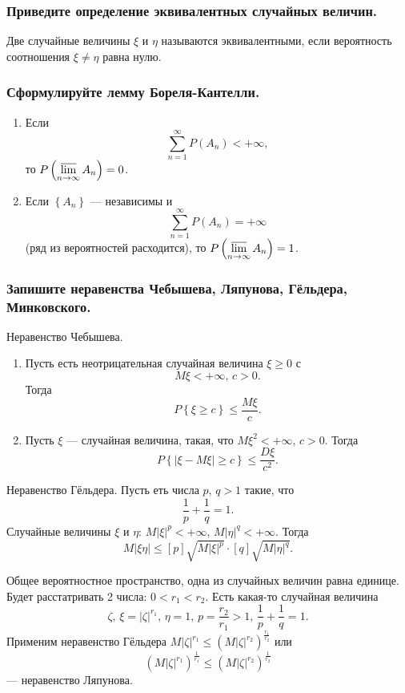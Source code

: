 \subsubsection*{Приведите определение эквивалентных случайных величин.}

Две случайные величины $ \xi $ и $ \eta $ называются эквивалентными, если вероятность соотношения $ \xi \neq \eta $ равна нулю.

\subsubsection*{Сформулируйте лемму Бореля-Кантелли.}

\begin{enumerate}
\item Если
$$ \sum \limits_{n=1}^{ \infty } P \left( A_n \right) < + \infty,$$
то $P \left( \varlimsup \limits_{n \to \infty } A_n \right) = 0$.
\item Если $ \left\{ A_n \right\} $ --- независимы и
$$ \sum \limits_{n=1}^{ \infty } P \left( A_n \right) = + \infty $$
(ряд из вероятностей расходится), то $P \left( \varlimsup \limits_{n \to \infty } A_n \right) = 1$.
\end{enumerate}

\subsubsection*{Запишите неравенства Чебышева, Ляпунова, Гёльдера, Минковского.}

Неравенство Чебышева.
\begin{enumerate}
\item Пусть есть неотрицательная случайная величина $ \xi \geq 0$ с
$$M \xi < + \infty, \,
c > 0.$$
Тогда
$$P \left\{ \xi \geq c \right\} \leq \frac{M \xi }{c}.$$
\item Пусть $ \xi $ --- случайная величина, такая, что $M \xi^2 < + \infty, \, c > 0$.
Тогда
$$P \left\{ \left| \xi - M \xi \right| \geq c \right\} \leq \frac{D \xi }{c^2}.$$
\end{enumerate}

Неравенство Гёльдера.
Пусть еть числа $p, \, q > 1$ такие, что
$$ \frac{1}{p} + \frac{1}{q} = 1.$$
Случайные величины $ \xi $ и $ \eta: \, M \left| \xi \right|^p < + \infty, \, M \left| \eta \right|^q < + \infty $.
Тогда
$$M \left| \xi \eta \right| \leq [p]\sqrt{M \left| \xi \right|^p} \cdot [q]\sqrt{M \left| \eta \right|^q}.$$

Общее вероятностное пространство, одна из случайных величин равна единице.
Будет расстатривать 2 числа: $0 < r_1 < r_2$.
Есть какая-то случайная величина
$$ \zeta, \,
\xi = \left| \zeta \right|^{r_1}, \,
\eta = 1, \,
p = \frac{r_2}{r_1} > 1, \, 
\frac{1}{p} + \frac{1}{q} = 1.$$
Применим неравенство Гёльдера $M \left| \zeta \right|^{r_1} \leq \left( M \left| \zeta \right|^{r_2} \right)^{ \frac{r_1}{r_2}}$ или
$$ \left( M \left| \zeta \right|^{r_1} \right)^{ \frac{1}{r_1}} \leq \left( M \left| \zeta \right|^{r_2} \right)^{ \frac{1}{r_2}}$$
--- неравенство Ляпунова.

